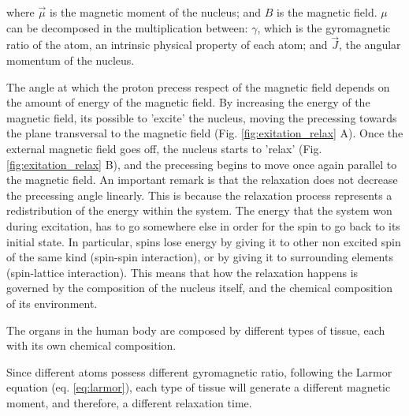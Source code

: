 where $\vec{\mu}$ is the magnetic moment of the nucleus; and $B$ is the
magnetic field. $\mu$ can be decomposed in the multiplication between:
$\gamma$, which is the gyromagnetic ratio of the atom, an intrinsic physical
property of each atom; and $\vec{J}$, the angular momentum of the nucleus.

%

The angle at which the proton precess respect of the magnetic field depends on
the amount of energy of the magnetic field. By increasing the energy of the
magnetic field, its possible to 'excite' the nucleus, moving the precessing towards
the plane transversal to the magnetic field (Fig. \ref{fig:exitation_relax} A).
Once the external magnetic field goes off, the nucleus starts to 'relax'
(Fig. \ref{fig:exitation_relax} B), and the precessing begins to move once
again parallel to the magnetic field. An important remark is that the relaxation
does not decrease the precessing angle linearly. This is because the relaxation
process represents a redistribution of the energy within the system. The energy that
the system won during excitation, has to go somewhere else in order for the
spin to go back to its initial state. In particular, spins lose energy by 
giving it to other non excited spin of the same kind (spin-spin interaction),
or by giving it to surrounding elements (spin-lattice interaction). This means
that how the relaxation happens is governed by the composition of the nucleus
itself, and the chemical composition of its environment.

The organs in the human body are composed by different types of tissue, each
with its own chemical composition. 


Since different atoms possess different
gyromagnetic ratio, following the Larmor equation (eq. \ref{eq:larmor}), each
type of tissue will generate a different magnetic moment, and therefore,
a different relaxation time.


